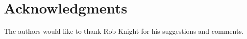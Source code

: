 \section{Acknowledgments}
\label{sec:acknowledgments}
The authors would like to thank Rob Knight for his suggestions and comments.